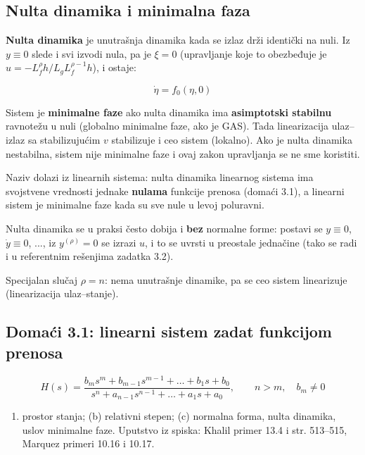 \documentclass[11pt,a4paper,parskip=half,headsepline,numbers=noenddot]{scrartcl}
\begin{document}
\subsection{Nulta dinamika i minimalna faza}

\textbf{Nulta dinamika} je unutrašnja dinamika kada se izlaz drži identički na nuli. Iz \(y \equiv 0\) slede i svi izvodi nula, pa je \(\xi = 0\) (upravljanje koje to obezbeđuje je \(u = -L_f^\rho h/L_gL_f^{\rho-1}h\)), i ostaje:

\[\dot\eta = f_0(\eta, 0)\]

\begin{kljucna}
Sistem je \textbf{minimalne faze} ako nulta dinamika ima \textbf{asimptotski stabilnu} ravnotežu u nuli (globalno minimalne faze, ako je GAS). Tada linearizacija ulaz--izlaz sa stabilizujućim \(v\) stabilizuje i ceo sistem (lokalno). Ako je nulta dinamika nestabilna, sistem nije minimalne faze i ovaj zakon upravljanja se ne sme koristiti.
\end{kljucna}

Naziv dolazi iz linearnih sistema: nulta dinamika linearnog sistema ima svojstvene vrednosti jednake \textbf{nulama} funkcije prenosa (domaći 3.1), a linearni sistem je minimalne faze kada su sve nule u levoj poluravni.

Nulta dinamika se u praksi često dobija i \textbf{bez} normalne forme: postavi se \(y \equiv 0\), \(\dot y \equiv 0\), ..., iz \(y^{(\rho)} = 0\) se izrazi \(u\), i to se uvrsti u preostale jednačine (tako se radi i u referentnim rešenjima zadatka 3.2).

Specijalan slučaj \(\rho = n\): nema unutrašnje dinamike, pa se ceo sistem linearizuje (linearizacija ulaz--stanje).

\subsection{Domaći 3.1: linearni sistem zadat funkcijom prenosa}

\[H(s) = \frac{b_ms^m + b_{m-1}s^{m-1} + \dots + b_1s + b_0}{s^n + a_{n-1}s^{n-1} + \dots + a_1s + a_0}, \qquad n > m, \quad b_m \ne 0\]

\begin{enumerate}
\def\labelenumi{(\alph{enumi})}
\item prostor stanja; (b) relativni stepen; (c) normalna forma, nulta dinamika, uslov minimalne faze. Uputstvo iz spiska: Khalil primer 13.4 i str. 513--515, Marquez primeri 10.16 i 10.17.
\end{enumerate}
\end{document}
